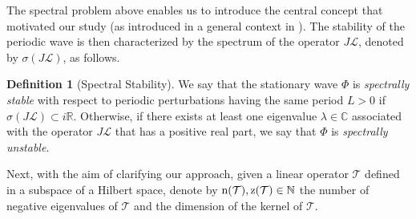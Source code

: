 \documentclass[10pt,reqno,a4paper]{amsart} %
\theoremstyle{definition} %
\numberwithin{equation}{section}
\numberwithin{figure}{section}
\newtheorem{definition}[theorem]{Definition}
\begin{document}
The spectral problem above enables us to introduce the central concept that motivated our study (as introduced in a general context in \cite[Section 5.3]{AnguloBook}). The stability of the periodic wave is then characterized by the spectrum of the operator $J \mathcal{L}$, denoted by $\sigma(J \mathcal{L})$, as follows.

\begin{definition}[Spectral Stability]\label{Spectral Stability Definition}
We say that the stationary wave \(\Phi\) is \textit{spectrally stable}  with respect to periodic perturbations having the same period $L>0$  if \(\sigma(J\mathcal{L}) \subset i\mathbb{R}\). Otherwise, if there exists at least one eigenvalue \(\lambda \in \mathbb{C}\) associated with the operator \(J\mathcal{L}\) that has a positive real part, we say that \(\Phi\) is \textit{spectrally unstable}.
\end{definition}


Next, with the aim of clarifying our approach, given a linear operator $\mathcal{T}$ defined in a subspace of a Hilbert space, denote by ${\rm n}(\mathcal{T}), {\rm z}(\mathcal{T}) \in \mathbb{N}$ the number of negative eigenvalues of $\mathcal{T}$ and the dimension of the kernel of $\mathcal{T}$.
\end{document}
